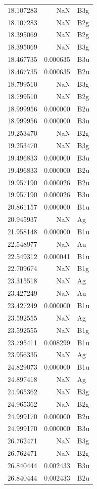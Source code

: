 \begin{longtable}{rrl}
18.107283 & NaN & B3g \\
18.107283 & NaN & B2g \\
18.395069 & NaN & B2g \\
18.395069 & NaN & B3g \\
18.467735 & 0.000635 & B3u \\
18.467735 & 0.000635 & B2u \\
18.799510 & NaN & B3g \\
18.799510 & NaN & B2g \\
18.999956 & 0.000000 & B2u \\
18.999956 & 0.000000 & B3u \\
19.253470 & NaN & B2g \\
19.253470 & NaN & B3g \\
19.496833 & 0.000000 & B3u \\
19.496833 & 0.000000 & B2u \\
19.957190 & 0.000026 & B2u \\
19.957190 & 0.000026 & B3u \\
20.861157 & 0.000000 & B1u \\
20.945937 & NaN & Ag \\
21.958148 & 0.000000 & B1u \\
22.548977 & NaN & Au \\
22.549312 & 0.000041 & B1u \\
22.709674 & NaN & B1g \\
23.315518 & NaN & Ag \\
23.427249 & NaN & Au \\
23.427249 & 0.000000 & B1u \\
23.592555 & NaN & Ag \\
23.592555 & NaN & B1g \\
23.795411 & 0.008299 & B1u \\
23.956335 & NaN & Ag \\
24.829073 & 0.000000 & B1u \\
24.897418 & NaN & Ag \\
24.965362 & NaN & B3g \\
24.965362 & NaN & B2g \\
24.999170 & 0.000000 & B2u \\
24.999170 & 0.000000 & B3u \\
26.762471 & NaN & B3g \\
26.762471 & NaN & B2g \\
26.840444 & 0.002433 & B3u \\
26.840444 & 0.002433 & B2u \\

\end{longtable}
